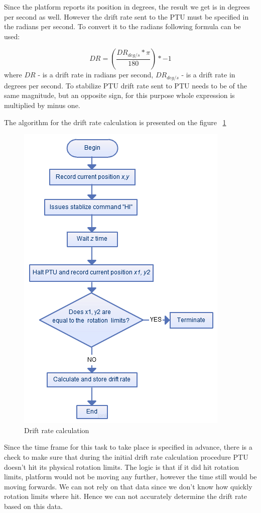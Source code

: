 Since the platform reports its position in degrees, the result we get is in degrees per second as well. However the drift rate sent to the PTU must be specified in the radians per second. To convert it to the radians following formula can be used: 

\[ DR=(\frac{DR_{deg/s} * \pi}{180})*-1\] where $DR$ - is a drift rate in radians per second, $DR_{deg/s}$ - is a drift rate in degrees per second. To stabilize PTU drift rate sent to PTU needs to be of the same magnitude, but an opposite sign, for this purpose whole expression is multiplied by minus one. 

The algorithm for the drift rate calculation is presented on the figure ~\ref{fig:DriftRate}

\begin{figure}[H]
\centering
\centerline{\includegraphics[scale=0.70]{./images/DriftRate}}
\caption{Drift rate calculation}
\label{fig:DriftRate}
\end{figure}

Since the time frame for this task to take place is specified in advance, there is a check to make sure that during the initial drift rate calculation procedure PTU doesn't hit its physical rotation limits. The logic is that if it did hit rotation limits, platform would not be moving any further, however the time still would be moving forwards. We can not rely on that data since we don't know how quickly rotation limits where hit. Hence we can not accurately determine the drift rate based on this data.

